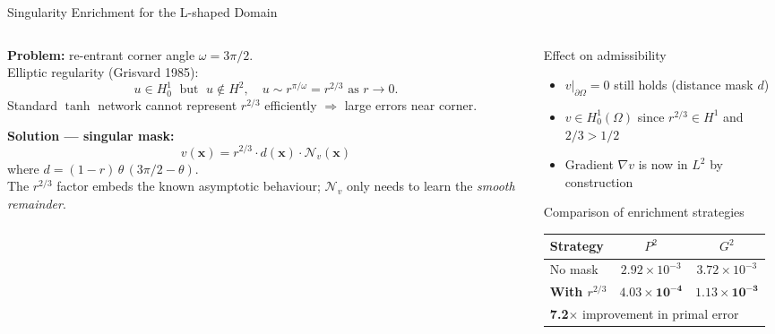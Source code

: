 \documentclass[10pt,aspectratio=169]{beamer}
\begin{document}
\begin{frame}{Singularity Enrichment for the L-shaped Domain}

  \begin{columns}[T]
    \begin{column}{0.50\textwidth}
      \textbf{Problem:} re-entrant corner angle $\omega = 3\pi/2$.
      \\[4pt]
      Elliptic regularity (Grisvard 1985):
      \[
        u \in H^1_0 \;\text{ but }\; u \notin H^2,
        \quad u \sim r^{\pi/\omega} = r^{2/3} \text{ as } r\to 0.
      \]
      Standard $\tanh$ network cannot represent
      $r^{2/3}$ efficiently $\Rightarrow$ large errors
      near corner.

      \bigskip
      \textbf{Solution — singular mask:}
      \[
        v(\mathbf{x}) = r^{2/3} \cdot d(\mathbf{x}) \cdot \mathcal{N}_v(\mathbf{x})
      \]
      where $d = (1-r)\,\theta\,(3\pi/2-\theta)$.
      \\[4pt]
      The $r^{2/3}$ factor embeds the known asymptotic
      behaviour; $\mathcal{N}_v$ only needs to learn the
      \emph{smooth remainder}.
    \end{column}
    \begin{column}{0.46\textwidth}
      \begin{block}{Effect on admissibility}
        \begin{itemize}
          \item $v|_{\partial\Omega} = 0$ still holds
                (distance mask $d$)
          \item $v \in H^1_0(\Omega)$ since
                $r^{2/3} \in H^1$ and $2/3 > 1/2$
          \item Gradient $\nabla v$ is now in $L^2$
                by construction
        \end{itemize}
      \end{block}
      \medskip
      \begin{block}{Comparison of enrichment strategies}
        \small
        \begin{tabular}{lcc}
          \toprule
          Strategy & $P^2$ & $G^2$ \\
          \midrule
          No mask & $2.92\times 10^{-3}$ & $3.72\times 10^{-3}$ \\
          \textbf{With $r^{2/3}$} & $\mathbf{4.03\times 10^{-4}}$ & $\mathbf{1.13\times 10^{-3}}$ \\
          \midrule
          \multicolumn{3}{l}{\footnotesize \textbf{7.2$\times$} improvement in primal error} \\
          \bottomrule
        \end{tabular}
      \end{block}
    \end{column}
  \end{columns}
\end{frame}
\end{document}

